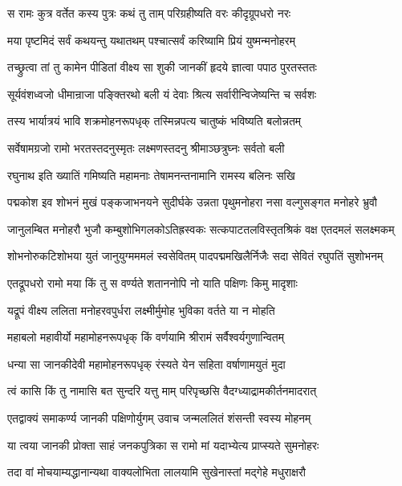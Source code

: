 \twolineshloka
{स रामः कुत्र वर्तेत कस्य पुत्रः कथं तु ताम्}
{परिग्रहीष्यति वरः कीदृग्रूपधरो नरः}%

\twolineshloka
{मया पृष्टमिदं सर्वं कथयन्तु यथातथम्}
{पश्चात्सर्वं करिष्यामि प्रियं युष्मन्मनोहरम्}%

\twolineshloka
{तच्छ्रुत्वा तां तु कामेन पीडितां वीक्ष्य सा शुकी}
{जानकीं हृदये ज्ञात्वा पपाठ पुरतस्ततः}%

\twolineshloka
{सूर्यवंशध्वजो धीमान्राजा पङ्क्तिरथो बली}
{यं देवाः श्रित्य सर्वारीन्विजेष्यन्ति च सर्वशः}%

\twolineshloka
{तस्य भार्यात्रयं भावि शक्रमोहनरूपधृक्}
{तस्मिन्नपत्य चातुष्कं भविष्यति बलोन्नतम्}%

\twolineshloka
{सर्वेषामग्रजो रामो भरतस्तदनुस्मृतः}
{लक्ष्मणस्तदनु श्रीमाञ्छत्रुघ्नः सर्वतो बली}%

\twolineshloka
{रघुनाथ इति ख्यातिं गमिष्यति महामनाः}
{तेषामनन्तनामानि रामस्य बलिनः सखि}%

\fourlineindentedshloka
{पद्मकोश इव शोभनं मुखं}
{पङ्कजाभनयने सुदीर्घके}
{उन्नता पृथुमनोहरा नसा}
{वल्गुसङ्गत मनोहरे भ्रुवौ}%

\fourlineindentedshloka
{जानुलम्बित मनोहरौ भुजौ}
{कम्बुशोभिगलकोऽतिह्रस्वकः}
{सत्कपाटतलविस्तृतश्रिकं}
{वक्ष एतदमलं सलक्ष्मकम्}%

\fourlineindentedshloka
{शोभनोरुकटिशोभया युतं}
{जानुयुग्मममलं स्वसेवितम्}
{पादपद्ममखिलैर्निजैः सदा}
{सेवितं रघुपतिं सुशोभनम्}%

\twolineshloka
{एतद्रूपधरो रामो मया किं तु स वर्ण्यते}
{शताननोपि नो याति पक्षिणः किमु मादृशाः}%

\twolineshloka
{यद्रूपं वीक्ष्य ललिता मनोहरवपुर्धरा}
{लक्ष्मीर्मुमोह भुविका वर्तते या न मोहति}%

\twolineshloka
{महाबलो महावीर्यो महामोहनरूपधृक्}
{किं वर्णयामि श्रीरामं सर्वैश्वर्यगुणान्वितम्}%

\twolineshloka
{धन्या सा जानकीदेवी महामोहनरूपधृक्}
{रंस्यते येन सहिता वर्षाणामयुतं मुदा}%

\twolineshloka
{त्वं कासि किं तु नामासि बत सुन्दरि यत्तु माम्}
{परिपृच्छसि वैदग्ध्याद्रामकीर्तनमादरात्}%

\twolineshloka
{एतद्वाक्यं समाकर्ण्य जानकी पक्षिणोर्युगम्}
{उवाच जन्मललितं शंसन्ती स्वस्य मोहनम्}%

\twolineshloka
{या त्वया जानकी प्रोक्ता साहं जनकपुत्रिका}
{स रामो मां यदाभ्येत्य प्राप्स्यते सुमनोहरः}%

\twolineshloka
{तदा वां मोचयाम्यद्धानान्यथा वाक्यलोभिता}
{लालयामि सुखेनास्तां मद्गेहे मधुराक्षरौ}%

